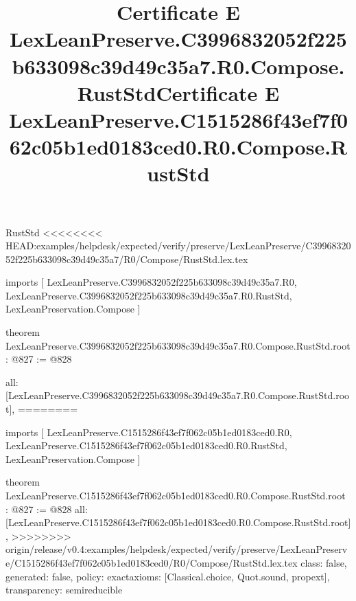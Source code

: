\begin{lexlean}{RustStd}
<<<<<<<< HEAD:examples/helpdesk/expected/verify/preserve/LexLeanPreserve/C3996832052f225b633098c39d49c35a7/R0/Compose/RustStd.lex.tex
\title{Certificate E LexLeanPreserve.C3996832052f225b633098c39d49c35a7.R0.Compose.RustStd}
\begin{coremodule}
imports [
  LexLeanPreserve.C3996832052f225b633098c39d49c35a7.R0,
  LexLeanPreserve.C3996832052f225b633098c39d49c35a7.R0.RustStd,
  LexLeanPreservation.Compose
]

theorem LexLeanPreserve.C3996832052f225b633098c39d49c35a7.R0.Compose.RustStd.root : @827 := @828 {
  all: [LexLeanPreserve.C3996832052f225b633098c39d49c35a7.R0.Compose.RustStd.root],
========
\title{Certificate E LexLeanPreserve.C1515286f43ef7f062c05b1ed0183ced0.R0.Compose.RustStd}
\begin{coremodule}
imports [
  LexLeanPreserve.C1515286f43ef7f062c05b1ed0183ced0.R0,
  LexLeanPreserve.C1515286f43ef7f062c05b1ed0183ced0.R0.RustStd,
  LexLeanPreservation.Compose
]

theorem LexLeanPreserve.C1515286f43ef7f062c05b1ed0183ced0.R0.Compose.RustStd.root : @827 := @828 {
  all: [LexLeanPreserve.C1515286f43ef7f062c05b1ed0183ced0.R0.Compose.RustStd.root],
>>>>>>>> origin/release/v0.4:examples/helpdesk/expected/verify/preserve/LexLeanPreserve/C1515286f43ef7f062c05b1ed0183ced0/R0/Compose/RustStd.lex.tex
  class: false,
  generated: false,
  policy: exact{axioms: [Classical.choice, Quot.sound, propext]},
  transparency: semireducible
}


\end{coremodule}}
\end{coremodule}
\end{lexlean}
